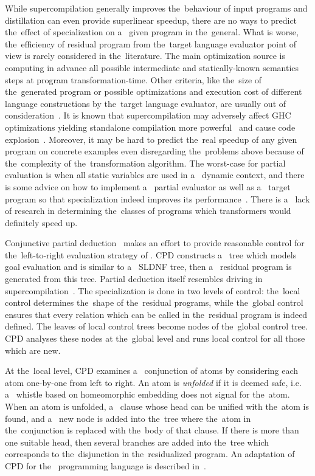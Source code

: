 While supercompilation generally improves the~behaviour of input programs and distillation can even provide superlinear speedup, there are no ways to predict the~effect of specialization on a~ given program in the~general.
What is worse, the~efficiency of residual program from the~target language evaluator point of view is rarely considered in the~literature.
The main optimization source is computing in advance all possible intermediate and statically-known semantics steps at program transformation-time.
Other criteria, like the~size of the~generated program or possible optimizations and execution cost of different language constructions by the~target language evaluator, are usually out of consideration~\cite{jonesbook}.
It is known that supercompilation may adversely affect GHC optimizations yielding standalone compilation more powerful~\cite{SCBE,TCES} and cause code explosion~\cite{SCHC}.
Moreover, it may be hard to predict the~real speedup of any given program on concrete examples even disregarding the~problems above because of the~complexity of the~transformation algorithm.
The worst-case for partial evaluation is when all static variables are used in a~ dynamic context, and there is some advice on how to implement a~ partial evaluator as well as a~ target program so that specialization indeed improves its performance~\cite{jonesbook,bulyonkov84}.
There is a~ lack of research in determining the~classes of programs which transformers would definitely speed up.

Conjunctive partial deduction~\cite{de1999conjunctive} makes an effort to provide reasonable control for the~left-to-right evaluation strategy of \pro{}.
CPD constructs a~ tree which models goal evaluation and is similar to a~ SLDNF tree, then a~ residual program is generated from this tree.
Partial deduction itself resembles driving in supercompilation~\cite{gluck1994partial}.
The specialization is done in two levels of control: the~local control determines the~shape of the~residual programs, while the~global control ensures that every relation which can be called in the~residual program is indeed defined.
The leaves of local control trees become nodes of the~global control tree.
CPD analyses these nodes at the~global level and runs local control for all those which are new.

At the~local level, CPD examines a~ conjunction of atoms by considering each atom one-by-one from left to right.
An atom is \emph{unfolded} if it is deemed safe, i.e. a~ whistle based on homeomorphic embedding does not signal for the~atom.
When an atom is unfolded, a~ clause whose head can be unified with the~atom is found, and a~ new node is added into the~tree where the~atom in the~conjunction is replaced with the~body of that clause.
If there is more than one suitable head, then several branches are added into the~tree which corresponds to the~disjunction in the~residualized program.
An adaptation of CPD for the~\mk{} programming language is described in~\cite{lozov2019relational}.

